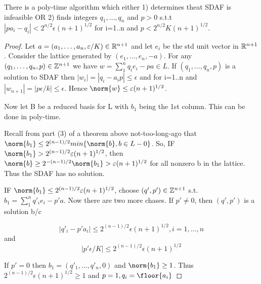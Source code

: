 \begin{theorem}
There is a poly-time algorithm which either 1) determines theat SDAF is infeasible OR 2) finds integers $q_1, \dots, q_n$ and $p>0$ s.t.t $|pa_i - q_i| < 2^{n/2}\epsilon(n+1)^{1/2}$ for i=1..n and $p < 2^{n/2}K(n+1)^{1/2}$.
\end{theorem}
\begin{proof}
Let $a=(a_1, \dots, a_n, \varepsilon/K) \in \mathbb R^{n+1}$ and let $e_i$ be the std unit vector in $\mathbb R^{n+1}$. Consider the lattice generated by $(e_1, \dots, e_n, -a)$. For any $(q_1, \dots, q_n, p) \in \mathbb Z^{n+1}$ we have $w = \sum_1^n q_ie_i - pa \in L$. If $(q_1, \dots, q_n, p)$ is a solution to SDAF then $|w_i| = |q_i -a_ip| \leq \epsilon$ and for i=1..n and $|w_{n+1}| = |p\epsilon/k| \leq \epsilon$. Hence $\norm{w} \leq \epsilon (n+1)^{1/2}$. 

Now let B be a reduced basis for L with $b_1$ being the 1st column. This can be done in poly-time. 

Recall from part (3) of a theorem above not-too-long-ago that $\norm{b_1} \leq 2^{(n-1)/2} min\{\norm{b}, b \in L - 0\}$. So, IF $\norm{b_1} > 2^{(n-1)/2}\epsilon(n+1)^{1/2}$, then $\norm{b} \geq 2^{-(n-1)/2}\norm{b_1} > \epsilon(n+1)^{1/2}$ for all nonzero b in the lattice. Thus the SDAF has no solution.

IF $\norm{b_1} \leq 2^{(n-1)/2}\epsilon(n+1)^{1/2}$, choose $(q', p') \in \mathbb Z^{n+1}$ s.t. $b_1 = \sum_1^n q'_ie_i -p'a$. Now there are two more chases. If $p' \neq 0$, then $(q', p')$ is a solution b/c 

\[ |q'_i -p'a_i| \leq 2^{(n-1)/2}\epsilon(n+1)^{1/2}, i=1, \dots, n\]
and
\[ |p'\epsilon/K| \leq 2^{(n-1)/2}\epsilon(n+1)^{1/2} \]

If $p'=0$ then $b_1 = (q'_1, \dots, q'_n, 0)$ and $\norm{b_1} \geq 1$. Thus $2^{(n-1)/2}\epsilon(n+1)^{1/2} \geq 1$ and $p=1, q_i = \floor{a_i}$
\end{proof}



